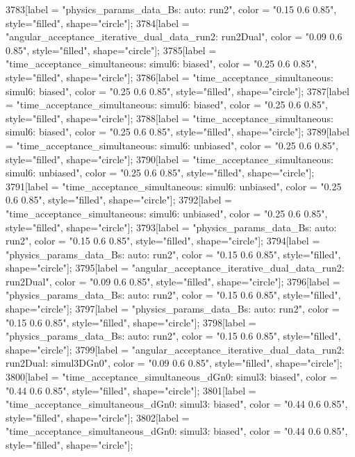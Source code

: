 {	3783[label = "physics_params_data_Bs\nfit: auto\nyear: run2", color = "0.15 0.6 0.85", style="filled", shape="circle"];
	3784[label = "angular_acceptance_iterative_dual_data_run2\nangacc: run2Dual", color = "0.09 0.6 0.85", style="filled", shape="circle"];
	3785[label = "time_acceptance_simultaneous\ntimeacc: simul6\ntrigger: biased", color = "0.25 0.6 0.85", style="filled", shape="circle"];
	3786[label = "time_acceptance_simultaneous\ntimeacc: simul6\ntrigger: biased", color = "0.25 0.6 0.85", style="filled", shape="circle"];
	3787[label = "time_acceptance_simultaneous\ntimeacc: simul6\ntrigger: biased", color = "0.25 0.6 0.85", style="filled", shape="circle"];
	3788[label = "time_acceptance_simultaneous\ntimeacc: simul6\ntrigger: biased", color = "0.25 0.6 0.85", style="filled", shape="circle"];
	3789[label = "time_acceptance_simultaneous\ntimeacc: simul6\ntrigger: unbiased", color = "0.25 0.6 0.85", style="filled", shape="circle"];
	3790[label = "time_acceptance_simultaneous\ntimeacc: simul6\ntrigger: unbiased", color = "0.25 0.6 0.85", style="filled", shape="circle"];
	3791[label = "time_acceptance_simultaneous\ntimeacc: simul6\ntrigger: unbiased", color = "0.25 0.6 0.85", style="filled", shape="circle"];
	3792[label = "time_acceptance_simultaneous\ntimeacc: simul6\ntrigger: unbiased", color = "0.25 0.6 0.85", style="filled", shape="circle"];
	3793[label = "physics_params_data_Bs\nfit: auto\nyear: run2", color = "0.15 0.6 0.85", style="filled", shape="circle"];
	3794[label = "physics_params_data_Bs\nfit: auto\nyear: run2", color = "0.15 0.6 0.85", style="filled", shape="circle"];
	3795[label = "angular_acceptance_iterative_dual_data_run2\nangacc: run2Dual", color = "0.09 0.6 0.85", style="filled", shape="circle"];
	3796[label = "physics_params_data_Bs\nfit: auto\nyear: run2", color = "0.15 0.6 0.85", style="filled", shape="circle"];
	3797[label = "physics_params_data_Bs\nfit: auto\nyear: run2", color = "0.15 0.6 0.85", style="filled", shape="circle"];
	3798[label = "physics_params_data_Bs\nfit: auto\nyear: run2", color = "0.15 0.6 0.85", style="filled", shape="circle"];
	3799[label = "angular_acceptance_iterative_dual_data_run2\nangacc: run2Dual\ntimeacc: simul3DGn0", color = "0.09 0.6 0.85", style="filled", shape="circle"];
	3800[label = "time_acceptance_simultaneous_dGn0\ntimeacc: simul3\ntrigger: biased", color = "0.44 0.6 0.85", style="filled", shape="circle"];
	3801[label = "time_acceptance_simultaneous_dGn0\ntimeacc: simul3\ntrigger: biased", color = "0.44 0.6 0.85", style="filled", shape="circle"];
	3802[label = "time_acceptance_simultaneous_dGn0\ntimeacc: simul3\ntrigger: biased", color = "0.44 0.6 0.85", style="filled", shape="circle"];
}

